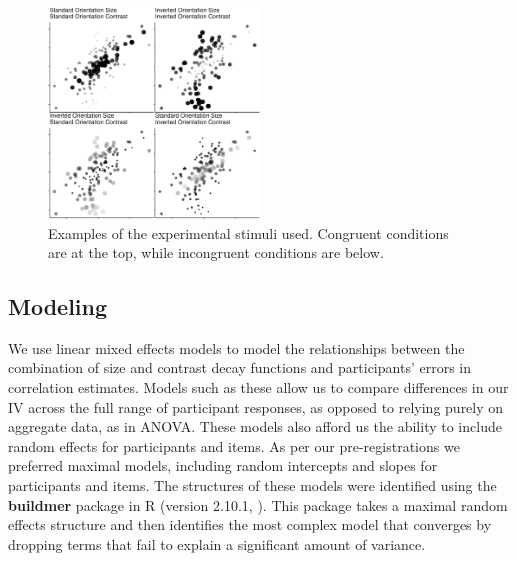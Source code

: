 \documentclass[manuscript, review, anonymous, screen]{acmart}
\begin{document}
\begin{figure}

\includegraphics[width=0.5\textwidth,height=\textheight]{size_and_contrast_files/figure-pdf/fig-examples-1.pdf} \hfill{}

\caption{\label{fig-examples}Examples of the experimental stimuli used.
Congruent conditions are at the top, while incongruent conditions are
below.}
\end{figure}

\hypertarget{sec-gen-modelling}{%
\subsection{Modeling}\label{sec-gen-modelling}}

We use linear mixed effects models to model the relationships between
the combination of size and contrast decay functions and participants'
errors in correlation estimates. Models such as these allow us to
compare differences in our IV across the full range of participant
responses, as opposed to relying purely on aggregate data, as in ANOVA.
These models also afford us the ability to include random effects for
participants and items. As per our pre-registrations we preferred
maximal models, including random intercepts and slopes for participants
and items. The structures of these models were identified using the
\textbf{buildmer} package in R (version 2.10.1,
\citep{voeten_buildmer}). This package takes a maximal random effects
structure and then identifies the most complex model that converges by
dropping terms that fail to explain a significant amount of variance.
\end{document}
